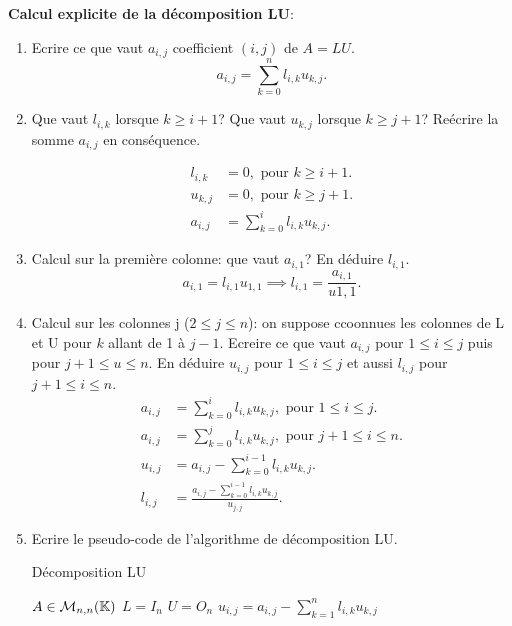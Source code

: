 \documentclass[a4paper,10pt]{article}
\begin{document}
\textbf{Calcul explicite de la décomposition LU}:
\begin{enumerate}
    \item Ecrire ce que vaut $a_{i, j}$ coefficient $(i, j)$ de $A = LU$.
\[
a_{i, j} = \sum_{k = 0}^n l_{i, k} u_{k, j}.
\]

    \item Que vaut $l_{i, k}$ lorsque $k \geq i + 1$? Que vaut $u_{k, j}$ lorsque
$k \geq j + 1$? Reécrire la somme $a_{i, j}$ en conséquence.

\begin{align*}
l_{i, k}& = 0,\text{ pour } k \geq i + 1. \\
u_{k, j}& = 0,\text{ pour } k \geq j + 1. \\
a_{i, j}& = \sum_{k = 0}^i l_{i, k} u_{k, j}.
\end{align*}

    \item Calcul sur la première colonne: que vaut $a_{i, 1}$? En déduire $l_{i, 1}$.
\[
    a_{i, 1} = l_{i, 1} u_{1, 1} \implies l_{i, 1} = \frac{a_{i, 1}}{u{1, 1}}.
\]

    \item Calcul sur les colonnes j ($2 \leq j \leq n$): on suppose ccoonnues les colonnes
    de L et U pour $k$ allant de 1 à $j - 1$. Ecreire ce que vaut $a_{i, j}$ pour
    $1 \leq i \leq j$ puis pour $j + 1 \leq u \leq n$. En déduire $u_{i, j}$ pour
    $1 \leq i \leq j$ et aussi $l_{i, j}$ pour $j + 1 \leq i \leq n$.
\begin{align*}
a_{i, j}& = \sum_{k = 0}^i l_{i, k} u_{k, j}, \text{ pour } 1 \leq i \leq j. \\
a_{i, j}& = \sum_{k = 0}^j l_{i, k} u_{k, j}, \text{ pour } j + 1 \leq i \leq n. \\
u_{i, j}& = a_{i, j} - \sum_{k = 0}^{i - 1} l_{i, k} u_{k, j}. \\
l_{i, j}& = \displaystyle \frac{a_{i, j} - \sum_{k = 0}^{i - 1} l_{i, k} u_{k, j}}{u_{j, j}}.
\end{align*}

    \item Ecrire le pseudo-code de l'algorithme de décomposition LU.
\begin{algorithm}
\caption{Décomposition LU}
\begin{algorithmic}
\STATE $A \in \mathcal{M}_{n, n}(\mathbb{K})$
\STATE $L = I_n$
\STATE $U = O_n$
        \STATE $u_{i, j} = a_{i, j} - \sum_{k = 1}^n l_{i, k}u_{k, j}$
    \ENDFOR


\end{algorithmic}
\end{algorithm}
\end{enumerate}
\end{document}
